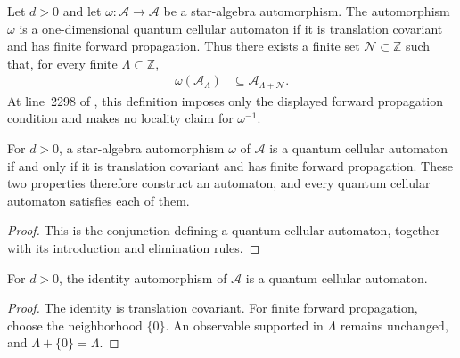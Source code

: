 \begin{definition}
    \label{def:qca}
    \leanok
    Let $d>0$ and let $\omega\colon\mathcal A\to\mathcal A$ be a star-algebra
    automorphism.  The automorphism $\omega$ is a one-dimensional quantum
    cellular automaton if it is translation covariant and has finite forward
    propagation.  Thus there exists a finite set $\mathcal N\subset\mathbb Z$
    such that, for every finite $\Lambda\subset\mathbb Z$,
    \begin{align}
        \omega(\mathcal A_\Lambda) & \subseteq
        \mathcal A_{\Lambda+\mathcal N}.
    \end{align}
    At line~2298 of \cite{Cirac2017MPU}, this definition imposes only
    the displayed forward propagation condition and makes no locality claim for
    $\omega^{-1}$.
\end{definition}

\begin{lemma}
    \label{thm:qca_iff_mk_projections}
    \leanok
    For $d>0$, a star-algebra automorphism $\omega$ of $\mathcal A$ is a
    quantum cellular automaton if and only if it is translation covariant and
    has finite forward propagation.  These two properties therefore construct an
    automaton, and every quantum cellular automaton satisfies each of them.
\end{lemma}

\begin{proof}\leanok
    This is the conjunction defining a quantum cellular automaton, together with
    its introduction and elimination rules.
\end{proof}

\begin{lemma}
    \label{thm:qca_identity}
    \leanok
    For $d>0$, the identity automorphism of $\mathcal A$ is a quantum cellular
    automaton.
\end{lemma}

\begin{proof}\leanok
    The identity is translation covariant.  For finite forward propagation,
    choose the neighborhood $\{0\}$.  An observable supported in $\Lambda$
    remains unchanged, and $\Lambda+\{0\}=\Lambda$.
\end{proof}

